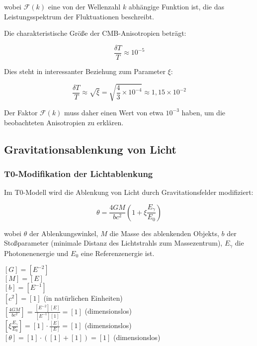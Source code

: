 \documentclass[12pt,a4paper]{article}
\theoremstyle{definition}
\begin{document}
wobei $\mathcal{F}(k)$ eine von der Wellenzahl $k$ abhängige Funktion ist, die das Leistungsspektrum der Fluktuationen beschreibt.

Die charakteristische Größe der CMB-Anisotropien beträgt:

\begin{equation}
\frac{\delta T}{T} \approx 10^{-5}
\end{equation}

Dies steht in interessanter Beziehung zum Parameter $\xi$:

\begin{equation}
\frac{\delta T}{T} \approx \sqrt{\xi} = \sqrt{\frac{4}{3} \times 10^{-4}} \approx 1,15 \times 10^{-2}
\end{equation}

Der Faktor $\mathcal{F}(k)$ muss daher einen Wert von etwa $10^{-3}$ haben, um die beobachteten Anisotropien zu erklären.

\subsection{Gravitationsablenkung von Licht}

\subsubsection{T0-Modifikation der Lichtablenkung}

Im T0-Modell wird die Ablenkung von Licht durch Gravitationsfelder modifiziert:

\begin{equation}
\boxed{\theta = \frac{4GM}{bc^2}\left(1 + \xi \frac{E_\gamma}{E_0}\right)}
\end{equation}

wobei $\theta$ der Ablenkungswinkel, $M$ die Masse des ablenkenden Objekts, $b$ der Stoßparameter (minimale Distanz des Lichtstrahls zum Massezentrum), $E_\gamma$ die Photonenenergie und $E_0$ eine Referenzenergie ist.

\begin{einheitencheck}
$[G] = [E^{-2}]$\\
$[M] = [E]$\\
$[b] = [E^{-1}]$\\
$[c^2] = [1]$ (in natürlichen Einheiten)\\
$[\frac{4GM}{bc^2}] = \frac{[E^{-2}][E]}{[E^{-1}][1]} = [1]$ (dimensionslos)\\
$[\xi \frac{E_\gamma}{E_0}] = [1] \cdot \frac{[E]}{[E]} = [1]$ (dimensionslos)\\
$[\theta] = [1] \cdot ([1] + [1]) = [1]$ (dimensionslos) \checkmark
\end{einheitencheck}
\end{document}

